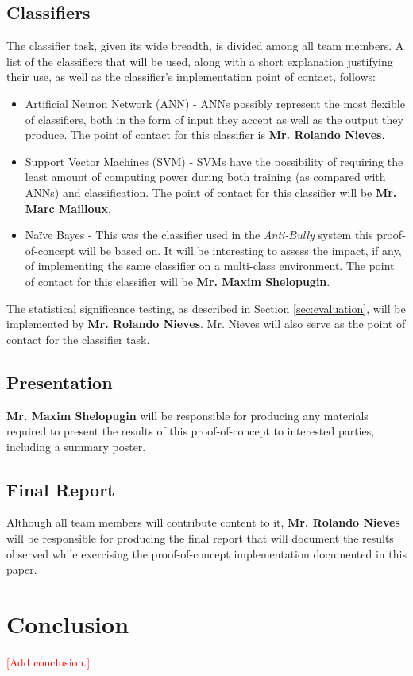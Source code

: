\documentclass[conference]{sig-alternate-05-2015}
\newcommand{\todo}[1]{{\textcolor{red}{[#1]}}}
\begin{document}
\subsection{Classifiers}\label{sec:classifier_task}
The classifier task, given its wide breadth, is divided among all team
members. A list of the classifiers that will be used, along with a short
explanation justifying their use, as well as the classifier's implementation
point of contact, follows:
\begin{itemize}
  \item Artificial Neuron Network (ANN) - ANNs possibly represent
  the most flexible of classifiers, both in the form of input they accept as
  well as the output they produce. The point of contact for this classifier is
  \textbf{Mr. Rolando Nieves}.
  \item Support Vector Machines (SVM) - SVMs have the possibility of requiring
  the least amount of computing power during both training (as compared with
  ANNs) and classification. The point of contact for this classifier will be
  \textbf{Mr. Marc Mailloux}.
  \item Na\"{i}ve Bayes - This was the classifier used in the \textit{Anti-Bully}
  system this proof-of-concept will be based on. It will be interesting to
  assess the impact, if any, of implementing the same classifier on a
  multi-class environment. The point of contact for this classifier will be
  \textbf{Mr. Maxim Shelopugin}.
\end{itemize}

The statistical significance testing, as described in Section
\ref{sec:evaluation}, will be implemented by \textbf{Mr. Rolando Nieves}. Mr.
Nieves will also serve as the point of contact for the classifier task.

\subsection{Presentation}\label{sec:presentation_task}
\textbf{Mr. Maxim Shelopugin} will be responsible for producing any materials
required to present the results of this proof-of-concept to interested parties,
including a summary poster.

\subsection{Final Report}\label{sec:report_task}
Although all team members will contribute content to it,
\textbf{Mr. Rolando Nieves} will be responsible for producing the final report
that will document the results observed while exercising the proof-of-concept
implementation documented in this paper.

\section{Conclusion}\label{sec:conclusion}
\todo{Add conclusion.}



\end{document}
